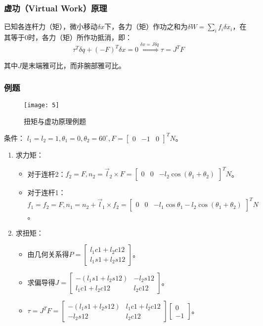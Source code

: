 \documentclass[
12pt, %
a4paper, 
oneside, %
headinclude,footinclude, %
]{scrartcl}
\begin{document}
\subsubsection[虚功原理]{虚功（Virtual Work）原理}
已知各连杆力（矩），微小移动$ \delta x $下，各力（矩）作功之和为$ \delta W = \sum_i f_i \delta x_i $，在其等于$ 0 $时，各力（矩）所作功抵消，即：
$$ \tau^T \delta q + (-F)^T \delta x = 0 \overset{\delta x = J \delta q}{\Longrightarrow} \tau = J^T F $$

其中$ J $是末端雅可比，而非腕部雅可比。
\subsubsection[例题]{例题}
\begin{figure}[H]
\centering 
\texttt{[image: 5]} 
\caption{扭矩与虚功原理例题}
\end{figure}

{\footnotesize
条件： $ l_1 = l_2 = 1, \theta_1 = 0, \theta_2 = 60^\circ, F = \begin{bmatrix} 0 & -1 & 0 \end{bmatrix}^T N $。
\begin{enumerate}
\item 求力矩：
\begin{itemize}
\item 对于连杆2：$ f_2 = F, n_2 = \vec{l}_2 \times F = \begin{bmatrix} 0 & 0 & -l_2 \cos(\theta_1 + \theta_2) \end{bmatrix}^T N $。
\item 对于连杆1：$ f_1 = f_2 = F, n_1 = n_2 + \vec{l}_1 \times f_2 = \begin{bmatrix} 0 & 0 & -l_1 \cos\theta_1 - l_2 \cos(\theta_1 + \theta_2) \end{bmatrix}^T N $。
\end{itemize} 
\item 求扭矩：
\begin{itemize}
\item 由几何关系得$ P = \begin{bmatrix} l_1 c1 + l_2 c12 \\ l_1 s1 + l_2 s12 \end{bmatrix} $。
\item 求偏导得$ J = \begin{bmatrix} -(l_1 s1 + l_2 s12) & -l_2 s12 \\ l_1 c1 + l_2 c12 & l_2 c12 \end{bmatrix} $。
\item $ \tau = J^T F = \begin{bmatrix} -(l_1 s1 + l_2 s12) & l_1 c1 + l_2 c12 \\ - l_2 s12 & l_2 c12 \end{bmatrix} \begin{bmatrix} 0 \\ -1 \end{bmatrix} $。
\end{itemize} 
\end{enumerate}
}
\end{document}
